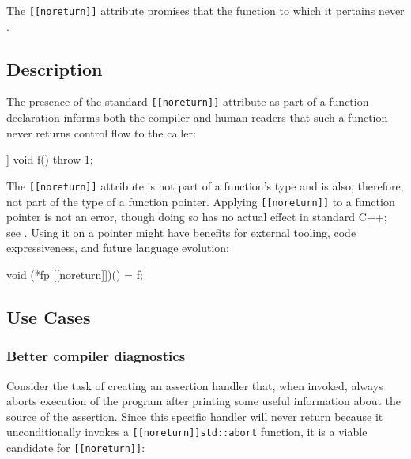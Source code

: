 

The \lstinline![[noreturn]]! attribute promises that the function to which
it pertains never .

\subsection[Description]{Description}\label{description}

The presence of the standard \lstinline![[noreturn]]! attribute as part of
a function declaration informs both the compiler and human readers that
such a function never returns control flow to the caller:

\begin{emcppslisting}[emcppsbatch=e1]
[[noreturn]] void f()
{
    throw 1;
}
\end{emcppslisting}


\noindent The \lstinline![[noreturn]]! attribute is not part of a function's type
and is also, therefore, not part of the type of a function pointer. Applying \lstinline![[noreturn]]! to a function
pointer is not an error, though doing so has no actual effect in standard C++; see
. Using it on a pointer might have
benefits for external tooling, code expressiveness, and future language
evolution:

\begin{emcppslisting}[emcppsbatch=e1]
void (*fp [[noreturn]])() = f;
\end{emcppslisting}


\subsection[Use Cases]{Use Cases}\label{use-cases}

\subsubsection[Better compiler diagnostics]{Better compiler diagnostics}\label{better-compiler-diagnostics}

Consider the task of creating an assertion handler that, when invoked,
always aborts execution of the program after printing some useful
information about the source of the assertion. Since this specific
handler will never return because it unconditionally invokes a \linebreak[4]%
\mbox{\lstinline![[noreturn]]std::abort!} function, it is a viable candidate for
\lstinline![[noreturn]]!:

